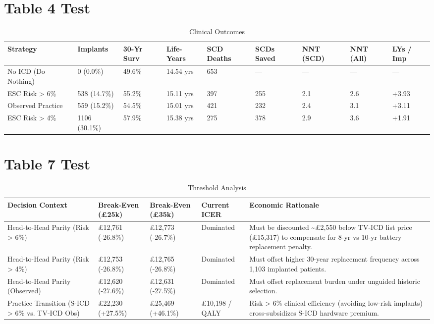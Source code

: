 \documentclass[11pt]{article}
\begin{document}
\section{Table 4 Test}

\begin{table}[H]
\centering
\caption{Clinical Outcomes}
\centering
\fontsize{8}{10}\selectfont
\setlength{\tabcolsep}{3pt}\begin{tabular}[t]{>{\raggedright\arraybackslash}p{2.4cm}llllllll}
\toprule
Strategy & Implants & 30-Yr Surv & Life-Years & SCD Deaths & SCDs Saved & NNT (SCD) & NNT (All) & LYs / Imp\\
\midrule
No ICD (Do Nothing) & 0 (0.0\%) & 49.6\% & 14.54 yrs & 653 & — & — & — & —\\
ESC Risk > 6\% & 538 (14.7\%) & 55.2\% & 15.11 yrs & 397 & 255 & 2.1 & 2.6 & +3.93\\
Observed Practice & 559 (15.2\%) & 54.5\% & 15.01 yrs & 421 & 232 & 2.4 & 3.1 & +3.11\\
ESC Risk > 4\% & 1106 (30.1\%) & 57.9\% & 15.38 yrs & 275 & 378 & 2.9 & 3.6 & +1.91\\
\bottomrule
\end{tabular}
\end{table}
\newpage
\section{Table 7 Test}
\begin{table}[H]
\centering
\caption{Threshold Analysis}
\centering
\fontsize{8.5}{10.5}\selectfont
\setlength{\tabcolsep}{4pt}\begin{tabular}[t]{>{\raggedright\arraybackslash}p{3.0cm}lll>{\raggedright\arraybackslash}p{4.2cm}}
\toprule
Decision Context & Break-Even (£25k) & Break-Even (£35k) & Current ICER & Economic Rationale\\
\midrule
Head-to-Head Parity (Risk > 6\%) & £12,761 (-26.8\%) & £12,773 (-26.7\%) & Dominated & Must be discounted \textasciitilde{}£2,550 below TV-ICD list price (£15,317) to compensate for 8-yr vs 10-yr battery replacement penalty.\\
Head-to-Head Parity (Risk > 4\%) & £12,753 (-26.8\%) & £12,765 (-26.8\%) & Dominated & Must offset higher 30-year replacement frequency across 1,103 implanted patients.\\
Head-to-Head Parity (Observed) & £12,620 (-27.6\%) & £12,631 (-27.5\%) & Dominated & Must offset replacement burden under unguided historic selection.\\
Practice Transition (S-ICD > 6\% vs. TV-ICD Obs) & £22,230 (+27.5\%) & £25,469 (+46.1\%) & £10,198 / QALY & Risk > 6\% clinical efficiency (avoiding low-risk implants) cross-subsidizes S-ICD hardware premium.\\
\bottomrule
\end{tabular}
\end{table}
\end{document}
